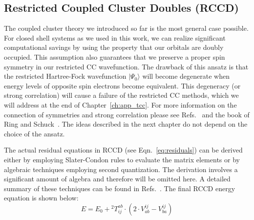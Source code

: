 \subsection{Restricted Coupled Cluster Doubles (RCCD)
\label{sec:preliminaries_rccd}}
The coupled cluster theory we introduced so far is the most general case 
possible. For closed shell systems as we used in this work, we can 
realize significant computational savings by using the property that our 
orbitals are doubly occupied. This assumption also guarantees that we preserve 
a proper spin symmetry in our restricted CC wavefunction. The drawback of this 
ansatz is that the restricted Hartree-Fock wavefunction $|\Psi_{0}\rangle$ 
will become degenerate when energy levels of opposite spin 
electrons become equivalent. This degeneracy (or strong correlation)
will cause a failure of the restricted CC methods, which we will address at the 
end of Chapter~\ref{ch:app_tcc}. For more information on the 
connection of symmetries and strong correlation please see 
Refs.~\cite{jimenez2012projected, scuseria2011projected} and the book of Ring 
and Schuck~\cite{ring2004nuclear}. The ideas described in 
the next chapter do not depend on the choice of the ansatz.

The actual residual equations in RCCD (see Eqn.~\ref{eq:residuals}) can be 
derived either by employing Slater-Condon rules to evaluate the matrix elements 
or by algebraic techniques employing second quantization. The derivation 
involves a significant amount of algebra and therefore will be 
omitted here. A detailed summary of these techniques can be found in 
Refs.~\cite{crawford2000introduction, shavitt2009many}. The final RCCD energy 
equation is shown below:
%
\begin{equation}
 E = E_{0} + {}^{2} T^{ab}_{ij} \cdot (2 \cdot V^{ij}_{ab} - V^{ij}_{ba})
\label{eq:ccd_energy_equation}
\end{equation}
%

